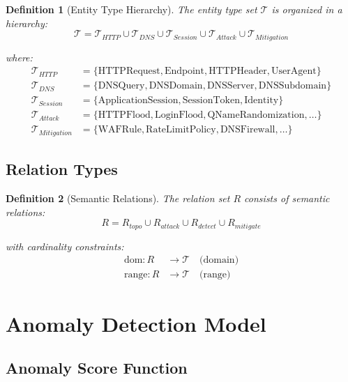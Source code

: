 \documentclass[11pt]{article}
\newtheorem{definition}{Definition}
\begin{document}
\begin{definition}[Entity Type Hierarchy]
The entity type set $\mathcal{T}$ is organized in a hierarchy:
\begin{equation}
    \mathcal{T} = \mathcal{T}_{HTTP} \cup \mathcal{T}_{DNS} \cup \mathcal{T}_{Session} \cup \mathcal{T}_{Attack} \cup \mathcal{T}_{Mitigation}
\end{equation}

where:
\begin{align}
    \mathcal{T}_{HTTP} &= \{\text{HTTPRequest}, \text{Endpoint}, \text{HTTPHeader}, \text{UserAgent}\} \\
    \mathcal{T}_{DNS} &= \{\text{DNSQuery}, \text{DNSDomain}, \text{DNSServer}, \text{DNSSubdomain}\} \\
    \mathcal{T}_{Session} &= \{\text{ApplicationSession}, \text{SessionToken}, \text{Identity}\} \\
    \mathcal{T}_{Attack} &= \{\text{HTTPFlood}, \text{LoginFlood}, \text{QNameRandomization}, \ldots\} \\
    \mathcal{T}_{Mitigation} &= \{\text{WAFRule}, \text{RateLimitPolicy}, \text{DNSFirewall}, \ldots\}
\end{align}
\end{definition}

\subsection{Relation Types}

\begin{definition}[Semantic Relations]
The relation set $R$ consists of semantic relations:
\begin{equation}
    R = R_{topo} \cup R_{attack} \cup R_{detect} \cup R_{mitigate}
\end{equation}

with cardinality constraints:
\begin{align}
    \text{dom}: R &\rightarrow \mathcal{T} \quad \text{(domain)} \\
    \text{range}: R &\rightarrow \mathcal{T} \quad \text{(range)}
\end{align}
\end{definition}

\section{Anomaly Detection Model}

\subsection{Anomaly Score Function}
\end{document}
